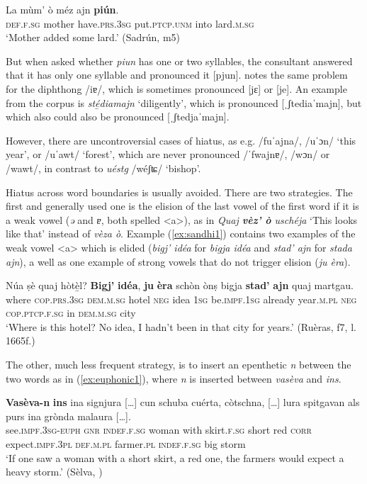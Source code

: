 \ea\label{ex:lard}
\gll La mùm' ò méz ajn \textbf{piún}.\\
\textsc{def.f.sg} mother have.\textsc{prs.3sg} put.\textsc{ptcp.unm} into lard.\textsc{m.sg}\\
\glt `Mother added some lard.' (Sadrún, m5)
\z

But when asked whether \textit{piun} has one or two syllables, the consultant answered that it has only one syllable and pronounced it [pjun]. \citet[3f.]{Caduff1952} notes the same problem for the diphthong /iɐ/, which is sometimes pronounced [jɛ] or [je]. An example from the corpus is \textit{sté̱diamajn} `diligently', which is pronounced [ˌʃtediaˈmajn], but which also could also be pronounced [ˌʃtedjaˈmajn].

However, there are uncontroversial cases of hiatus, as e.g. /fuˈajna/, /uˈɔn/ `this year', or /uˈawt/ `forest', which are never pronounced /ˈfwajnɐ/, /wɔn/ or /wawt/, in contrast to \textit{uéstg} /wéʃʨ/ `bishop'.

Hiatus across word boundaries is usually avoided. There are two strategies. The first and generally used one is the elision of the last vowel of the first word if it is a weak vowel (\textit{ə} and \textit{ɐ}, both spelled <a>), as in \textit{Quaj \textbf{vèz' ò} uschéja} `This looks like that' instead of \textit{vèza ò}. Example (\ref{ex:sandhi1}) contains two examples of the weak vowel <a> which is elided (\textit{bigj' idéa} for \textit{bigja idéa} and \textit{stad' ajn} for \textit{stada ajn}), a well as one example of strong vowels that do not trigger elision (\textit{ju èra}).

\ea
\label{ex:sandhi1}
\gll Núa ṣè quaj hòtè̱l? \textbf{Bigj'} \textbf{idéa}, \textbf{ju} \textbf{èra} schòn ònṣ bigja \textbf{stad’} \textbf{ajn} quaj martgau.   \\
where \textsc{cop.prs.3sg} \textsc{dem.m.sg} hotel \textsc{neg} idea \textsc{1sg} be.\textsc{impf.1sg} already year.\textsc{m.pl} \textsc{neg} \textsc{cop.ptcp.f.sg} in \textsc{dem.m.sg} city\\
\glt `Where is this hotel? No idea, I hadn't been in that city for years.' (Ruèras, f7, l. 1665f.)
\z

The other, much less frequent strategy, is to insert an epenthetic \textit{n} between the two words as in (\ref{ex:euphonic1}), where \textit{n} is inserted between \textit{vasèva} and \textit{ins}.

\ea
\label{ex:euphonic1}
\gll    \textbf{Vasèva-n} \textbf{ins} ina signjura […] cun schuba cuérta, còtschna, […] lura spitgavan als purs ina grònda malaura […].\\
see.\textsc{impf.3sg-euph} \textsc{gnr} \textsc{indef.f.sg} woman {} with skirt.\textsc{f.sg} short red {} \textsc{corr} expect.\textsc{impf.3pl} \textsc{def.m.pl} farmer.\textsc{pl} \textsc{indef.f.sg} big storm\\
\glt `If one saw a woman with a short skirt, a red one, the farmers would expect a heavy storm.' (Sèlva, \citealt[34]{Büchli1966})
\z


